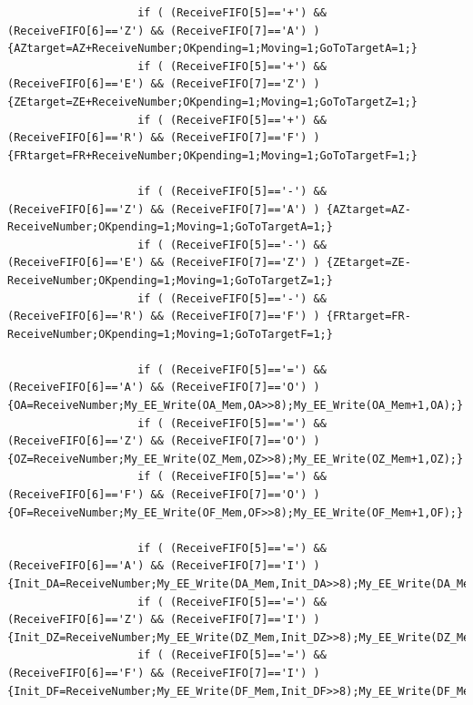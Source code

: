 \documentclass[
  a4paper,
  twoside,
  titlepage,
  12pt]{article}
\numberwithin{equation}{section}
\numberwithin{figure}{section}
\numberwithin{table}{section}
\begin{document}
\begin{verbatim}
                    if ( (ReceiveFIFO[5]=='+') && (ReceiveFIFO[6]=='Z') && (ReceiveFIFO[7]=='A') ) {AZtarget=AZ+ReceiveNumber;OKpending=1;Moving=1;GoToTargetA=1;}
                    if ( (ReceiveFIFO[5]=='+') && (ReceiveFIFO[6]=='E') && (ReceiveFIFO[7]=='Z') ) {ZEtarget=ZE+ReceiveNumber;OKpending=1;Moving=1;GoToTargetZ=1;}
                    if ( (ReceiveFIFO[5]=='+') && (ReceiveFIFO[6]=='R') && (ReceiveFIFO[7]=='F') ) {FRtarget=FR+ReceiveNumber;OKpending=1;Moving=1;GoToTargetF=1;}

                    if ( (ReceiveFIFO[5]=='-') && (ReceiveFIFO[6]=='Z') && (ReceiveFIFO[7]=='A') ) {AZtarget=AZ-ReceiveNumber;OKpending=1;Moving=1;GoToTargetA=1;}
                    if ( (ReceiveFIFO[5]=='-') && (ReceiveFIFO[6]=='E') && (ReceiveFIFO[7]=='Z') ) {ZEtarget=ZE-ReceiveNumber;OKpending=1;Moving=1;GoToTargetZ=1;}
                    if ( (ReceiveFIFO[5]=='-') && (ReceiveFIFO[6]=='R') && (ReceiveFIFO[7]=='F') ) {FRtarget=FR-ReceiveNumber;OKpending=1;Moving=1;GoToTargetF=1;}

                    if ( (ReceiveFIFO[5]=='=') && (ReceiveFIFO[6]=='A') && (ReceiveFIFO[7]=='O') ) {OA=ReceiveNumber;My_EE_Write(OA_Mem,OA>>8);My_EE_Write(OA_Mem+1,OA);}
                    if ( (ReceiveFIFO[5]=='=') && (ReceiveFIFO[6]=='Z') && (ReceiveFIFO[7]=='O') ) {OZ=ReceiveNumber;My_EE_Write(OZ_Mem,OZ>>8);My_EE_Write(OZ_Mem+1,OZ);}
                    if ( (ReceiveFIFO[5]=='=') && (ReceiveFIFO[6]=='F') && (ReceiveFIFO[7]=='O') ) {OF=ReceiveNumber;My_EE_Write(OF_Mem,OF>>8);My_EE_Write(OF_Mem+1,OF);}

                    if ( (ReceiveFIFO[5]=='=') && (ReceiveFIFO[6]=='A') && (ReceiveFIFO[7]=='I') ) {Init_DA=ReceiveNumber;My_EE_Write(DA_Mem,Init_DA>>8);My_EE_Write(DA_Mem+1,Init_DA);}
                    if ( (ReceiveFIFO[5]=='=') && (ReceiveFIFO[6]=='Z') && (ReceiveFIFO[7]=='I') ) {Init_DZ=ReceiveNumber;My_EE_Write(DZ_Mem,Init_DZ>>8);My_EE_Write(DZ_Mem+1,Init_DZ);}
                    if ( (ReceiveFIFO[5]=='=') && (ReceiveFIFO[6]=='F') && (ReceiveFIFO[7]=='I') ) {Init_DF=ReceiveNumber;My_EE_Write(DF_Mem,Init_DF>>8);My_EE_Write(DF_Mem+1,Init_DF);}
                    

\end{verbatim}
\end{document}
